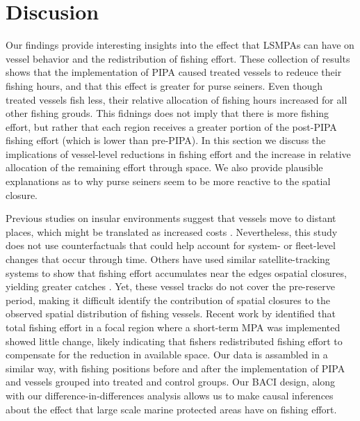\documentclass[12pt,]{article}
\begin{document}
\section{Discusion}\label{discusion}

Our findings provide interesting insights into the effect that LSMPAs
can have on vessel behavior and the redistribution of fishing effort.
These collection of results shows that the implementation of PIPA caused
treated vessels to redeuce their fishing hours, and that this effect is
greater for purse seiners. Even though treated vessels fish less, their
relative allocation of fishing hours increased for all other fishing
grouds. This fidnings does not imply that there is more fishing effort,
but rather that each region receives a greater portion of the post-PIPA
fishing effort (which is lower than pre-PIPA). In this section we
discuss the implications of vessel-level reductions in fishing effort
and the increase in relative allocation of the remaining effort through
space. We also provide plausible explanations as to why purse seiners
seem to be more reactive to the spatial closure.

Previous studies on insular environments suggest that vessels move to
distant places, which might be translated as increased costs
\citep{stevenson_2013}. Nevertheless, this study does not use
counterfactuals that could help account for system- or fleet-level
changes that occur through time. Others have used similar
satellite-tracking systems to show that fishing effort accumulates near
the edges ospatial closures, yielding greater catches
\citep{murawski_2005}. Yet, these vessel tracks do not cover the
pre-reserve period, making it difficult identify the contribution of
spatial closures to the observed spatial distribution of fishing
vessels. Recent work by \citet{elahi_2018} identified that total fishing
effort in a focal region where a short-term MPA was implemented showed
little change, likely indicating that fishers redistributed fishing
effort to compensate for the reduction in available space. Our data is
assambled in a similar way, with fishing positions before and after the
implementation of PIPA and vessels grouped into treated and control
groups. Our BACI design, along with our difference-in-differences
analysis allows us to make causal inferences about the effect that large
scale marine protected areas have on fishing effort.
\end{document}
